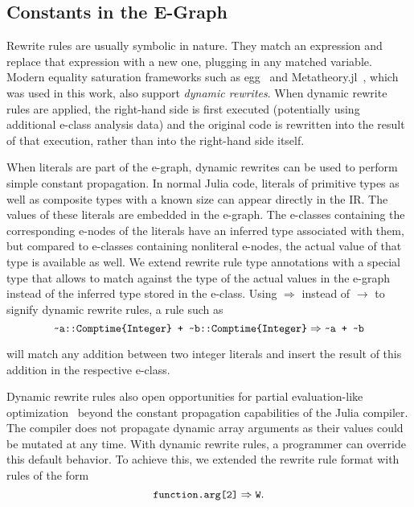 \subsection{Constants in the E-Graph}
Rewrite rules are usually symbolic in nature.
They match an expression and replace that expression with a new one, plugging in any matched variable.
Modern equality saturation frameworks such as egg~\cite{willseyEggFastExtensible2021} and Metatheory.jl~\cite{cheliMetatheoryjlFastElegant2021}, which was used in this work, also support \emph{dynamic rewrites}. When dynamic rewrite rules are applied, the right-hand side is first executed (potentially using additional e-class analysis data) and the original code is rewritten into the result of that execution, rather than into the right-hand side itself. 

When literals are part of the e-graph, dynamic rewrites can be used to perform simple constant propagation.
In normal Julia code, literals of primitive types as well as composite types with a known size can appear directly in the IR.
The values of these literals are embedded in the e-graph.
The e-classes containing the corresponding e-nodes of the literals have an inferred type associated with them, but compared to e-classes containing nonliteral e-nodes, the actual value of that type is available as well.
We extend rewrite rule type annotations with a special  type that allows to match against the type of the actual values in the e-graph instead of the inferred type stored in the e-class.
Using $\Rightarrow$ instead of $\rightarrow$ to signify dynamic rewrite rules, a rule such as 
{
$$ 
\code{\char`\~a::Comptime\{Integer\} + \char`\~b::Comptime\{Integer\}} \Rightarrow \code{\char`\~a + \char`\~b}
$$
}

\noindent will match any addition between two integer literals and insert the result of this addition in the respective e-class. %

Dynamic rewrite rules also open opportunities for partial evaluation-like optimization~\cite{10.5555/286076,futamuraPartialEvaluationComputation1999} beyond the constant propagation capabilities of the Julia compiler. 
The compiler does not propagate dynamic array arguments as their values could be mutated at any time.
With dynamic rewrite rules, a programmer can override this default behavior.
To achieve this, we extended the rewrite rule format with rules of the form 
{ $$ \code{function.arg[2]}\Rightarrow \code{W}.$$}

